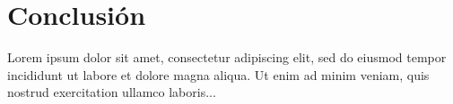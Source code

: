 \section*{Conclusión}

Lorem ipsum dolor sit amet, consectetur adipiscing elit, sed do 
eiusmod tempor incididunt ut labore et dolore magna aliqua. Ut 
enim ad minim veniam, quis nostrud exercitation ullamco laboris...